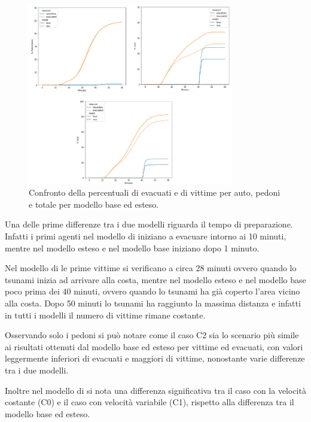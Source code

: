 \begin{figure}[p]
    \centering
    \includegraphics[width=0.8\textwidth]{images/analisi/WANG_comparison2.png}
    \caption{Confronto della percentuali di evacuati e di vittime per auto, pedoni e totale per modello base ed esteso.}
    \label{fig:analisi-comparison-wang2}
\end{figure}

Una delle prime differenze tra i due modelli riguarda il tempo di preparazione. Infatti i primi agenti nel modello di
\textcite{wang2021novel} iniziano a evacuare intorno ai 10 minuti, mentre nel modello esteso e nel modello base iniziano
dopo 1 minuto.

Nel modello di \textcite{wang2021novel} le prime vittime si verificano a circa 28 minuti ovvero quando lo tsunami inizia ad arrivare alla costa,
mentre nel modello esteso e nel modello base poco prima dei 40 minuti, ovvero quando lo tsunami ha già coperto l'area vicino alla costa.
Dopo 50 minuti lo tsunami ha raggiunto la massima distanza e infatti in tutti i modelli il numero di vittime rimane costante.

Osservando solo i pedoni si può notare come il caso C2 sia lo scenario più simile ai risultati
ottenuti dal modello base ed esteso per vittime ed evacuati, con valori leggermente inferiori di evacuati e maggiori di vittime,
nonostante varie differenze tra i due modelli.

Inoltre nel modello di \textcite{wang2021novel} si nota una differenza significativa
tra il caso con la velocità costante (C0) e il caso con velocità variabile (C1),
rispetto alla differenza tra il modello base ed esteso.

